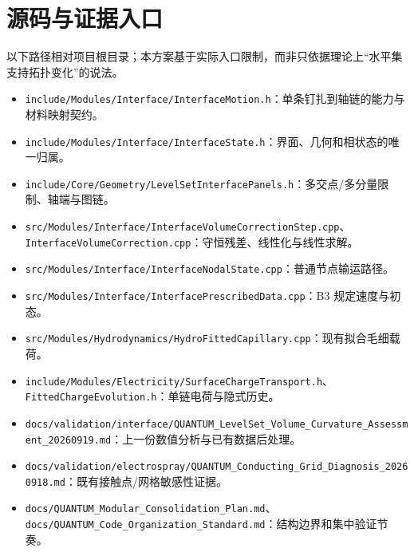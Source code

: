 \documentclass[11pt,a4paper]{article}
\newcommand{\code}[1]{{\small\nolinkurl{#1}}}
\begin{document}
\section{源码与证据入口}\label{sec:sourcecode}
以下路径相对项目根目录；本方案基于实际入口限制，而非只依据理论上“水平集支持拓扑变化”的说法。
\begin{itemize}
\item \code{include/Modules/Interface/InterfaceMotion.h}：单条钉扎到轴链的能力与材料映射契约。
\item \code{include/Modules/Interface/InterfaceState.h}：界面、几何和相状态的唯一归属。
\item \code{include/Core/Geometry/LevelSetInterfacePanels.h}：多交点/多分量限制、轴端与图链。
\item \code{src/Modules/Interface/InterfaceVolumeCorrectionStep.cpp}、\code{InterfaceVolumeCorrection.cpp}：守恒残差、线性化与线性求解。
\item \code{src/Modules/Interface/InterfaceNodalState.cpp}：普通节点输运路径。
\item \code{src/Modules/Interface/InterfacePrescribedData.cpp}：B3 规定速度与初态。
\item \code{src/Modules/Hydrodynamics/HydroFittedCapillary.cpp}：现有拟合毛细载荷。
\item \code{include/Modules/Electricity/SurfaceChargeTransport.h}、\code{FittedChargeEvolution.h}：单链电荷与隐式历史。
\item \code{docs/validation/interface/QUANTUM_LevelSet_Volume_Curvature_Assessment_20260919.md}：上一份数值分析与已有数据后处理。
\item \code{docs/validation/electrospray/QUANTUM_Conducting_Grid_Diagnosis_20260918.md}：既有接触点/网格敏感性证据。
\item \code{docs/QUANTUM_Modular_Consolidation_Plan.md}、\code{docs/QUANTUM_Code_Organization_Standard.md}：结构边界和集中验证节奏。
\end{itemize}
\end{document}

